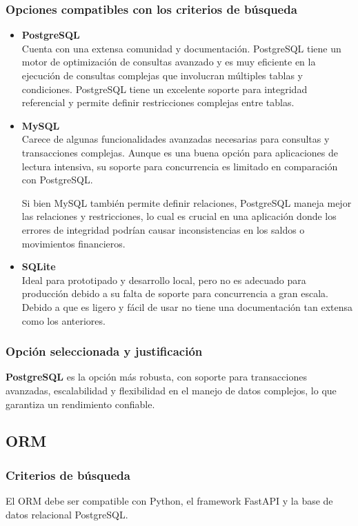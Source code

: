\subsubsection{Opciones compatibles con los criterios de búsqueda}
\begin{itemize}
    \item \textbf{PostgreSQL}\\
        Cuenta con una extensa comunidad y documentación.
        PostgreSQL tiene un motor de optimización de consultas avanzado y es muy eficiente en la ejecución de consultas complejas que involucran múltiples tablas y condiciones. PostgreSQL tiene un excelente soporte para integridad referencial y permite definir restricciones complejas entre tablas.
    \item \textbf{MySQL}\\
        Carece de algunas funcionalidades avanzadas necesarias para consultas y transacciones complejas. Aunque es una buena opción para aplicaciones de lectura intensiva, su soporte para concurrencia es limitado en comparación con PostgreSQL.

        Si bien MySQL también permite definir relaciones, PostgreSQL maneja mejor las relaciones y restricciones, lo cual es crucial en una aplicación donde los errores de integridad podrían causar inconsistencias en los saldos o movimientos financieros.
        
    \item \textbf{SQLite}\\
        Ideal para prototipado y desarrollo local, pero no es adecuado para producción debido a su falta de soporte para concurrencia a gran escala. Debido a que es ligero y fácil de usar no tiene una documentación tan extensa como los anteriores.
\end{itemize}
\subsubsection{Opción seleccionada y justificación}
\textbf{PostgreSQL} es la opción más robusta, con soporte para transacciones avanzadas, escalabilidad y flexibilidad en el manejo de datos complejos, lo que garantiza un rendimiento confiable\cite{ordonez2017administracion}.

\subsection{ORM}
\subsubsection{Criterios de búsqueda}
El ORM debe ser compatible con Python, el framework FastAPI y la base de datos relacional PostgreSQL.

